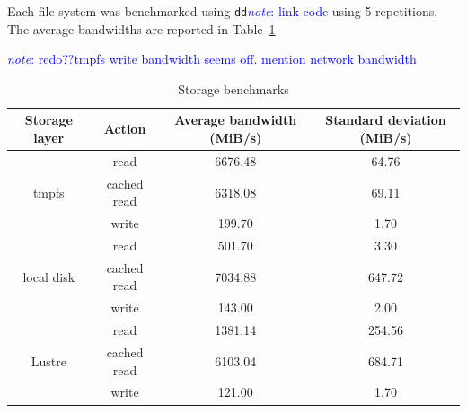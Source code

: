 \documentclass{report}
\newcommand{\note}[1]{\textcolor{blue}{\textit{note}: #1}}
\begin{document}
    Each file system was benchmarked using \texttt{dd}\note{link code} using 5 repetitions. The average bandwidths are
    reported in Table~\ref{table:fs}

    \note{redo??tmpfs write bandwidth seems off. mention network bandwidth}
    \begin{table}[h!]
    \centering
    \begin{tabular}{|c|c|c|c|} 
     \hline
     Storage layer & Action & Average bandwidth (MiB/s) & Standard deviation (MiB/s) \\
     \hline
     \multirow{3}{*}{tmpfs} & read & 6676.48 & 64.76 \\
     & cached read & 6318.08 & 69.11 \\
     & write & 199.70 & 1.70 \\
     \hline
     \multirow{3}{*}{local disk} & read & 501.70 & 3.30 \\
     & cached read & 7034.88 & 647.72 \\
     & write & 143.00 & 2.00 \\
     \hline
     \multirow{3}{*}{Lustre} & read & 1381.14 & 254.56 \\
     & cached read & 6103.04 & 684.71 \\
     & write & 121.00 & 1.70 \\

     \hline

    \end{tabular}
    \caption{Storage benchmarks}
    \label{table:fs}
    \end{table}




    
\end{document}
